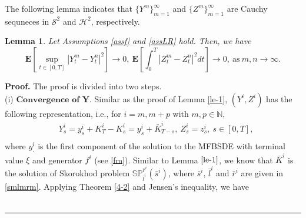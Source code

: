\documentclass[10pt]{article}%
\numberwithin{equation}{section}
\newtheorem{lemma}[theorem]{Lemma}
\newenvironment{proof}[1][Proof]{\noindent \textbf{#1.} }{\  \rule{0.5em}{0.5em}}
\def \E{\mathbf{E}}
\def \P{\mathbf{P}}
\begin{document}
The following lemma indicates that $\{Y^m\}_{m=1}^\infty$ and $\{Z^m\}_{m=1}^\infty$ are Cauchy sequneces in $\mathcal{S}^2$ and $\mathcal{H}^2$, respectively.
\begin{lemma}\label{le-2}
 Let Assumptions \ref{assf} and \ref{assLR} hold. Then, we have
 $$\mathbf{E}\left[\sup_{t\in[0,T]}\left|Y_t^m-Y_t^n\right|^2\right]\rightarrow 0,\ \mathbf{E}\left[\int_{0}^{T}\left|Z_{t}^m-Z_{t}^{n}\right|^2dt\right]\rightarrow 0,\ \text{as}\ m,n\rightarrow \infty.$$
\end{lemma}
\begin{proof}
The proof is divided into two steps.\\
(i) $\textbf{Convergence of Y}$. %
Similar as the proof of Lemma \ref{le-1}, $(Y^i,Z^i)$ has the following representation, i.e., for $i=m,m+p$ with   $m,p\in\mathbb{N}$,
\begin{equation}\begin{split}\label{Yi}
&Y_s^i=y_s^i+K^i_{T}-K^i_s=y_s^i+\bar{K}^{i}_{T-s},\ Z^i_s=z^i_s,\ s\in[0,T],\\
\end{split}   
\end{equation}
where $y_{\cdot}^i$ is the first component of the solution to the MFBSDE with terminal value $\xi$ and generator $f^i$ (see \eqref{fm}). Similar to Lemma $\ref{le-1}$, we know that $\bar{K}^i$ is the solution of Skorokhod problem $\mathbb{SP}_{\bar{l}^i}^{\bar{r}^i}(\bar{s}^i)$, where $\bar{s}^i$, $\bar{l}^i$ and $\bar{r}^i$ are given in \eqref{smlmrm}. %
 Applying Theorem \ref{4-2} and Jensen's inequality, we have 
\begin{equation}\label{ymymp}

\end{equation}
\end{proof}
\end{document}
